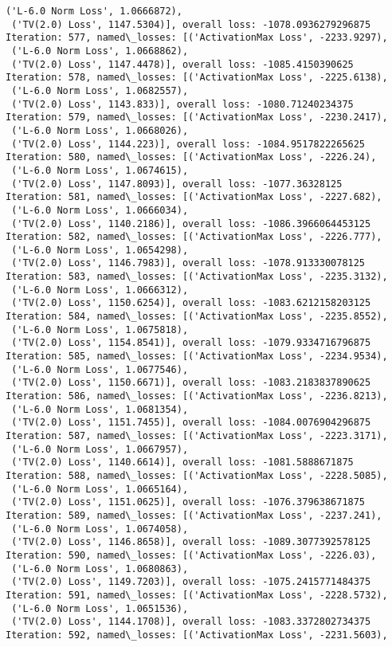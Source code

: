 \documentclass[10pt]{article}
\begin{document}
\begin{Verbatim}[commandchars=\\\{\}]
 ('L-6.0 Norm Loss', 1.0666872),
 ('TV(2.0) Loss', 1147.5304)], overall loss: -1078.0936279296875
Iteration: 577, named\_losses: [('ActivationMax Loss', -2233.9297),
 ('L-6.0 Norm Loss', 1.0668862),
 ('TV(2.0) Loss', 1147.4478)], overall loss: -1085.4150390625
Iteration: 578, named\_losses: [('ActivationMax Loss', -2225.6138),
 ('L-6.0 Norm Loss', 1.0682557),
 ('TV(2.0) Loss', 1143.833)], overall loss: -1080.71240234375
Iteration: 579, named\_losses: [('ActivationMax Loss', -2230.2417),
 ('L-6.0 Norm Loss', 1.0668026),
 ('TV(2.0) Loss', 1144.223)], overall loss: -1084.9517822265625
Iteration: 580, named\_losses: [('ActivationMax Loss', -2226.24),
 ('L-6.0 Norm Loss', 1.0674615),
 ('TV(2.0) Loss', 1147.8093)], overall loss: -1077.36328125
Iteration: 581, named\_losses: [('ActivationMax Loss', -2227.682),
 ('L-6.0 Norm Loss', 1.0666034),
 ('TV(2.0) Loss', 1140.2186)], overall loss: -1086.3966064453125
Iteration: 582, named\_losses: [('ActivationMax Loss', -2226.777),
 ('L-6.0 Norm Loss', 1.0654298),
 ('TV(2.0) Loss', 1146.7983)], overall loss: -1078.913330078125
Iteration: 583, named\_losses: [('ActivationMax Loss', -2235.3132),
 ('L-6.0 Norm Loss', 1.0666312),
 ('TV(2.0) Loss', 1150.6254)], overall loss: -1083.6212158203125
Iteration: 584, named\_losses: [('ActivationMax Loss', -2235.8552),
 ('L-6.0 Norm Loss', 1.0675818),
 ('TV(2.0) Loss', 1154.8541)], overall loss: -1079.9334716796875
Iteration: 585, named\_losses: [('ActivationMax Loss', -2234.9534),
 ('L-6.0 Norm Loss', 1.0677546),
 ('TV(2.0) Loss', 1150.6671)], overall loss: -1083.2183837890625
Iteration: 586, named\_losses: [('ActivationMax Loss', -2236.8213),
 ('L-6.0 Norm Loss', 1.0681354),
 ('TV(2.0) Loss', 1151.7455)], overall loss: -1084.0076904296875
Iteration: 587, named\_losses: [('ActivationMax Loss', -2223.3171),
 ('L-6.0 Norm Loss', 1.0667957),
 ('TV(2.0) Loss', 1140.6614)], overall loss: -1081.5888671875
Iteration: 588, named\_losses: [('ActivationMax Loss', -2228.5085),
 ('L-6.0 Norm Loss', 1.0665164),
 ('TV(2.0) Loss', 1151.0625)], overall loss: -1076.379638671875
Iteration: 589, named\_losses: [('ActivationMax Loss', -2237.241),
 ('L-6.0 Norm Loss', 1.0674058),
 ('TV(2.0) Loss', 1146.8658)], overall loss: -1089.3077392578125
Iteration: 590, named\_losses: [('ActivationMax Loss', -2226.03),
 ('L-6.0 Norm Loss', 1.0680863),
 ('TV(2.0) Loss', 1149.7203)], overall loss: -1075.2415771484375
Iteration: 591, named\_losses: [('ActivationMax Loss', -2228.5732),
 ('L-6.0 Norm Loss', 1.0651536),
 ('TV(2.0) Loss', 1144.1708)], overall loss: -1083.3372802734375
Iteration: 592, named\_losses: [('ActivationMax Loss', -2231.5603),

\end{Verbatim}
\end{document}
